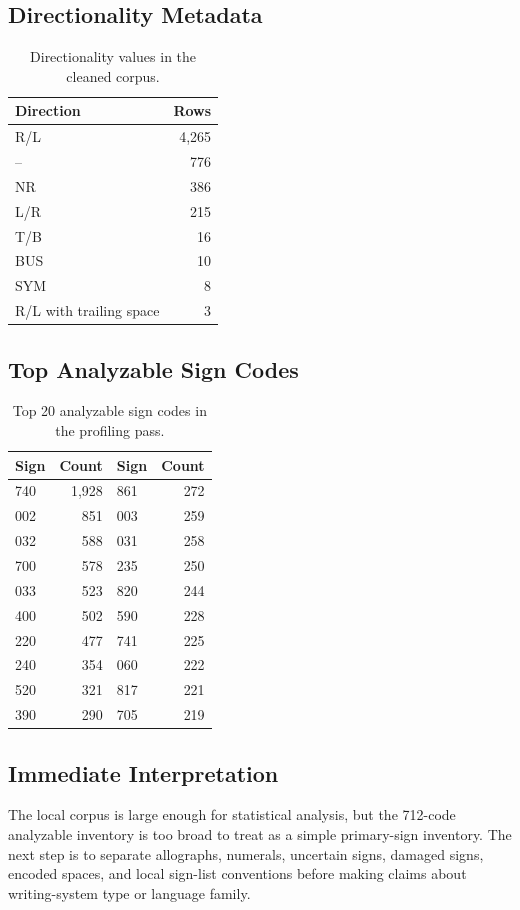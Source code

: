 \subsection{Directionality Metadata}

\begin{table}[htbp]
\centering
\begin{tabular}{lr}
\toprule
\textbf{Direction} & \textbf{Rows} \\
\midrule
R/L & 4,265 \\
-- & 776 \\
NR & 386 \\
L/R & 215 \\
T/B & 16 \\
BUS & 10 \\
SYM & 8 \\
R/L with trailing space & 3 \\
\bottomrule
\end{tabular}
\caption{Directionality values in the cleaned corpus.}
\label{tab:directionality}
\end{table}

\subsection{Top Analyzable Sign Codes}

\begin{table}[htbp]
\centering
\begin{tabular}{lr@{\qquad}lr}
\toprule
\textbf{Sign} & \textbf{Count} & \textbf{Sign} & \textbf{Count} \\
\midrule
740 & 1,928 & 861 & 272 \\
002 & 851 & 003 & 259 \\
032 & 588 & 031 & 258 \\
700 & 578 & 235 & 250 \\
033 & 523 & 820 & 244 \\
400 & 502 & 590 & 228 \\
220 & 477 & 741 & 225 \\
240 & 354 & 060 & 222 \\
520 & 321 & 817 & 221 \\
390 & 290 & 705 & 219 \\
\bottomrule
\end{tabular}
\caption{Top 20 analyzable sign codes in the profiling pass.}
\label{tab:top-signs}
\end{table}

\subsection{Immediate Interpretation}

The local corpus is large enough for statistical analysis, but the 712-code analyzable inventory is too broad to treat as a simple primary-sign inventory. The next step is to separate allographs, numerals, uncertain signs, damaged signs, encoded spaces, and local sign-list conventions before making claims about writing-system type or language family.
